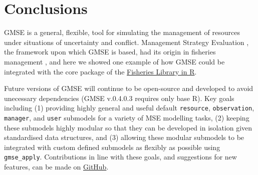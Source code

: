 \documentclass[]{article}
\begin{document}
\section{Conclusions}\label{conclusions}

GMSE is a general, flexible, tool for simulating the management of
resources under situations of uncertainty and conflict. Management
Strategy Evaluation \citep{Bunnefeld2011, Punt2016}, the framework upon
which GMSE is based, had its origin in fisheries management
\citep{Polacheck1999, Smith1999, Sainsbury2000}, and here we showed one
example of how GMSE could be integrated with the core package of the
\href{http://www.flr-project.org/}{Fisheries Library in R}.

Future versions of GMSE will continue to be open-source and developed to
avoid unecessary dependencies (GMSE v.0.4.0.3 requires only base R). Key
goals including (1) providing highly general and useful default
\texttt{resource}, \texttt{observation}, \texttt{manager}, and
\texttt{user} submodels for a variety of MSE modelling tasks, (2)
keeping these submodels highly modular so that they can be developed in
isolation given standardised data structures, and (3) allowing these
modular submodels to be integrated with custom defined submodels as
flexibly as possible using \texttt{gmse\_apply}. Contributions in line
with these goals, and suggestions for new features, can be made on
\href{https://github.com/bradduthie/gmse}{GitHub}.


\end{document}
